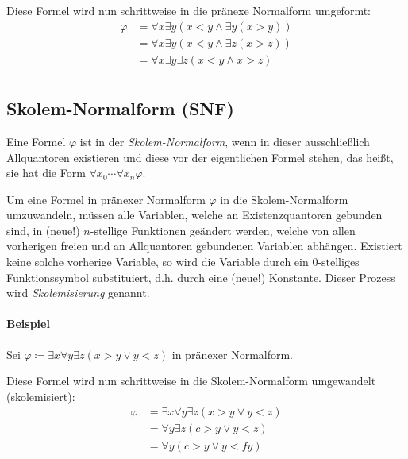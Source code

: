 				Diese Formel wird nun schrittweise in die pränexe Normalform umgeformt:
				\begin{align*}
					\varphi & = \forall x \exists y (x < y \land \exists y (x > y)) \tag{Umbenennung}            \\
					        & = \forall x \exists y (x < y \land \exists z (x > z)) \tag{Quantoren-Verschiebung} \\
					        & = \forall x \exists y \exists z (x < y \land x > z) \tag{Pränexe Normalform}       \\
				\end{align*}

		\subsection{Skolem-Normalform (SNF)}
			Eine Formel $ \varphi $ ist in der \textit{Skolem-Normalform}, wenn in dieser ausschließlich Allquantoren existieren und diese vor der eigentlichen Formel stehen, das heißt, sie hat die Form $ \forall x _ 0 \cdots \forall x _ n \varphi $.

			Um eine Formel in pränexer Normalform $ \varphi $ in die Skolem-Normalform umzuwandeln, müssen alle Variablen, welche an Existenzquantoren gebunden sind, in (neue!) $ n\text{-stellige} $ Funktionen geändert werden, welche von allen vorherigen freien und an Allquantoren gebundenen Variablen abhängen. Existiert keine solche vorherige Variable, so wird die Variable durch ein $ 0\text{-stelliges} $ Funktionssymbol substituiert, d.h. durch eine (neue!) Konstante. Dieser Prozess wird \textit{Skolemisierung} genannt.

			\paragraph{Beispiel}
				Sei $ \varphi \coloneqq \exists x \forall y \exists z (x > y \lor y < z) $ in pränexer Normalform.

				Diese Formel wird nun schrittweise in die Skolem-Normalform umgewandelt (skolemisiert):
				\begin{align*}
					\varphi & = \exists x \forall y \exists z (x > y \lor y < z) \tag{1. Existenzquantor} \\
					        & = \forall y \exists z (c > y \lor y < z) \tag{2. Existenzquantor}           \\
					        & = \forall y (c > y \lor y < fy) \tag{Skolem-Normalform}                     \\
				\end{align*}

